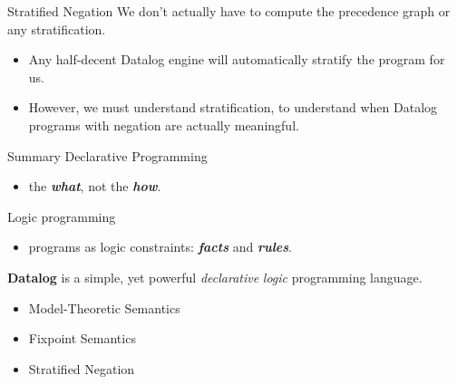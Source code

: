 \begin{frame}{Stratified Negation}
We don't actually have to compute the precedence graph or any stratification.
\begin{itemize}
    \item Any half-decent Datalog engine will automatically stratify the program for us.
    \item However, we must understand stratification, to understand when Datalog
    programs with negation are actually meaningful.
\end{itemize}
\end{frame}

\begin{frame}{Summary}
Declarative Programming
\begin{itemize}
    \item the \textbf{\emph{what}}, not the \textbf{\emph{how}}.
\end{itemize}

Logic programming
\begin{itemize}
    \item programs as logic constraints: \textbf{\emph{facts}} and \textbf{\emph{rules}}.
\end{itemize}

\textbf{Datalog} is a simple, yet powerful \emph{declarative} \emph{logic}
programming language.
\begin{itemize}
    \item Model-Theoretic Semantics
    \item Fixpoint Semantics
    \item Stratified Negation
\end{itemize}
\end{frame}

\begin{frame}[standout]
\end{frame}


